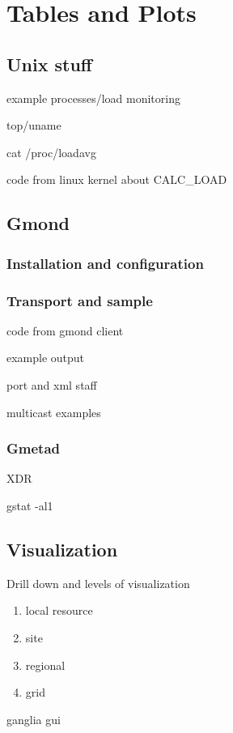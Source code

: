 \section{Tables and Plots}
\subsection{Unix stuff}
example processes/load monitoring

top/uname

cat /proc/loadavg

code from linux kernel about CALC\_LOAD

\newpage

\subsection{Gmond}

\subsubsection{Installation and configuration}
\newpage

\subsubsection{Transport and sample}
code from gmond client

example output 

port and xml staff

multicast examples
\newpage

\subsubsection{Gmetad}
\newpage

XDR

gstat -al1

\newpage

\subsection{Visualization}
Drill down and levels of visualization
\begin{enumerate}
  \item local resource
  \item site
  \item regional
  \item grid
\end{enumerate}

ganglia gui

